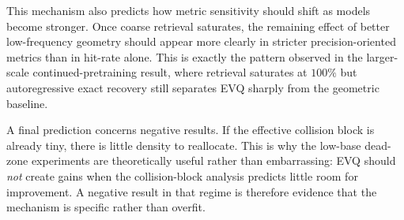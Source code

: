 This mechanism also predicts how metric sensitivity should shift as models become stronger. Once coarse retrieval saturates, the remaining effect of better low-frequency geometry should appear more clearly in stricter precision-oriented metrics than in hit-rate alone. This is exactly the pattern observed in the larger-scale continued-pretraining result, where retrieval saturates at \(100\%\) but autoregressive exact recovery still separates EVQ sharply from the geometric baseline.

A final prediction concerns negative results. If the effective collision block is already tiny, there is little density to reallocate. This is why the low-base dead-zone experiments are theoretically useful rather than embarrassing: EVQ should \emph{not} create gains when the collision-block analysis predicts little room for improvement. A negative result in that regime is therefore evidence that the mechanism is specific rather than overfit.
